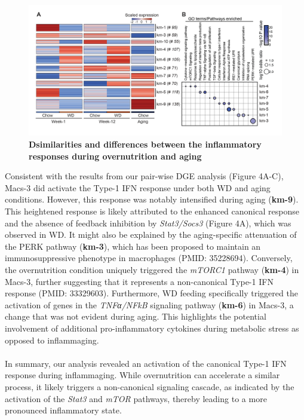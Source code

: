 \begin{figure}[H]
\centering
\includegraphics[width=\linewidth]{Chapter4/Fig/F2-11-02.png}
\caption[res-macs3-2]{\textbf{Dsimilarities and differences between the inflammatory responses during overnutrition and aging}
}
\label{fig2-12}
\end{figure}


Consistent with the results from our pair-wise DGE analysis (Figure 4A-C), Macs-3 did activate the Type-1 IFN response under both WD and aging conditions. However, this response was notably intensified during aging (\textbf{km-9}). This heightened response is likely attributed to the enhanced canonical response and the absence of feedback inhibition by \textit{Stat3/Socs3} (Figure 4A), which was observed in WD. It might also be explained by the aging-specific attenuation of the PERK pathway (\textbf{km-3}), which has been proposed to maintain an immunosuppressive phenotype in macrophages (PMID: 35228694). Conversely, the overnutrition condition uniquely triggered the \textit{mTORC1} pathway (\textbf{km-4}) in Macs-3, further suggesting that it represents a non-canonical Type-1 IFN response (PMID: 33329603). Furthermore, WD feeding specifically triggered the activation of genes in the \textit{TNFα/NFkB} signaling pathway (\textbf{km-6}) in Macs-3, a change that was not evident during aging. This highlights the potential involvement of additional pro-inflammatory cytokines during metabolic stress as opposed to inflammaging.\\\\
In summary, our analysis revealed an activation of the canonical Type-1 IFN response during inflammaging. While overnutrition can accelerate a similar process, it likely triggers a non-canonical signaling cascade, as indicated by the activation of the \textit{Stat3} and \textit{mTOR} pathways, thereby leading to a more pronounced inflammatory state.
\clearpage

